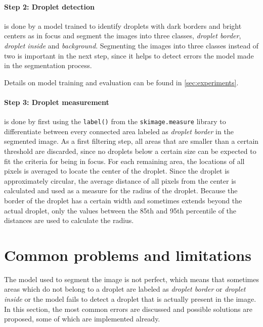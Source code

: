 \paragraph{Step 2: Droplet detection} is done by a model trained to identify droplets with dark borders and bright centers as in focus and segment the images into three classes, \emph{droplet border}, \emph{droplet inside} and \emph{background}.
Segmenting the images into three classes instead of two is important in the next step, since it helps to detect errors the model made in the segmentation process.

Details on model training and evaluation can be found in \ref{sec:experiments}.

\paragraph{Step 3: Droplet measurement} is done by first using the \texttt{label()} from the \texttt{skimage.measure} library to differentiate between every connected area labeled as \emph{droplet border} in the segmented image. 
As a first filtering step, all areas that are smaller than a certain threshold are discarded, since no droplets below a certain size can be expected to fit the criteria for being in focus.
For each remaining area, the locations of all pixels is averaged to locate the center of the droplet.
Since the droplet is approximately circular, the average distance of all pixels from the center is calculated and used as a measure for the radius of the droplet.
Because the border of the droplet has a certain width and sometimes extends beyond the actual droplet, only the values between the 85th and 95th percentile of the distances are used to calculate the radius.

\section{Common problems and limitations}
\label{sec:limitations}

The model used to segment the image is not perfect, which means that sometimes areas which do not belong to a droplet are labeled as \emph{droplet border} or \emph{droplet inside} or the model fails to detect a droplet that is actually present in the image.
In this section, the most common errors are discussed and possible solutions are proposed, some of which are implemented already.

